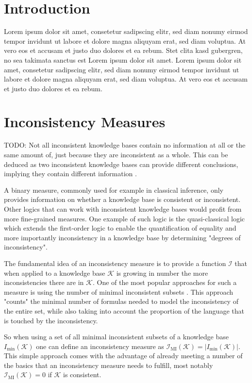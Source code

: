 \section{Introduction}
Lorem ipsum dolor sit amet, consetetur sadipscing elitr, sed diam nonumy eirmod tempor invidunt ut labore et dolore magna aliquyam erat, sed diam voluptua. At vero eos et accusam et justo duo dolores et ea rebum. Stet clita kasd gubergren, no sea takimata sanctus est Lorem ipsum dolor sit amet. Lorem ipsum dolor sit amet, consetetur sadipscing elitr, sed diam nonumy eirmod tempor invidunt ut labore et dolore magna aliquyam erat, sed diam voluptua. At vero eos et accusam et justo duo dolores et ea rebum.

\section{Inconsistency Measures}
TODO:
Not all inconsistent knowledge bases contain no information at all or the same amount of, just because they are inconsistent as a whole. This can be deduced as two inconsistent knowledge bases can provide different conclusions, implying they contain different information \cite{bertossi_approaches_2005}.

A binary measure, commonly used for example in classical inference, only provides information on whether a knowledge base is consistent or inconsistent. Other logics that can work with inconsistent knowledge bases would profit from more fine-grained measures.
One example of such logic is the quasi-classical logic \cite{grant_measuring_2006} which extends the first-order logic to enable the quantification of equality and more importantly inconsistency in a knowledge base by determining "degrees of inconsistency".

The fundamental idea of an inconsistency measure is to provide a function \(\mathcal{I}\) that when applied to a knowledge base \(\mathcal{K}\) is growing in number the more inconsistencies there are in \(\mathcal{K}\). One of the most popular approaches for such a measure is using the number of minimal inconsistent subsets \cite{hunter_measuring_2008}. This approach "counts" the minimal number of formulas needed to model the inconsistency of the entire set, while also taking into account the proportion of the language that is touched by the inconsistency.

So when using a set of all minimal inconsistent subsets of a knowledge base \(I_{\min}(\mathcal{K})\) one can define an inconsistency measure as \(\mathcal{I}_{\text{MI}}(\mathcal{K}) = \left| I_{\min}(\mathcal{K}) \right|\). This simple approach comes with the advantage of already meeting a number of the basics that an inconsistency measure needs to fulfill, most notably \(\mathcal{I}_{\text{MI}}(\mathcal{K}) = 0\) if \(\mathcal{K}\) is consistent.


